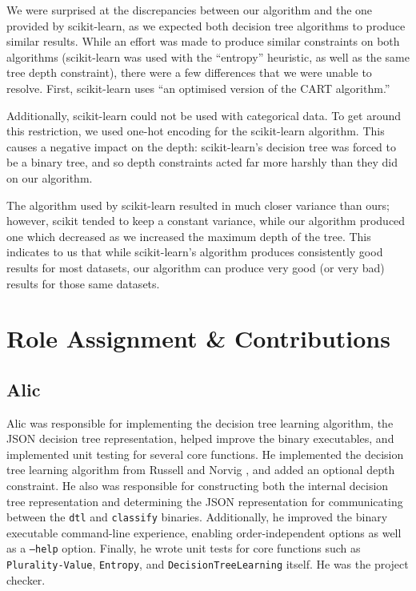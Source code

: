 \documentclass[screen, authorversion, nonacm, sigconf]{acmart}
\begin{document}
We were surprised at the discrepancies between our algorithm and the one provided by scikit-learn, as we expected both decision tree algorithms to produce similar results. While an effort was made to produce similar constraints on both algorithms (scikit-learn was used with the ``entropy'' heuristic, as well as the same tree depth constraint), there were a few differences that we were unable to resolve. First, scikit-learn uses ``an optimised version of the CART \cite{DBLP:books/wa/BreimanFOS84} algorithm.''

Additionally, scikit-learn could not be used with categorical data. To get around this restriction, we used one-hot encoding for the scikit-learn algorithm. This causes a negative impact on the depth: scikit-learn's decision tree was forced to be a binary tree, and so depth constraints acted far more harshly than they did on our algorithm.

The algorithm used by scikit-learn resulted in much closer variance than ours; however, scikit tended to keep a constant variance, while our algorithm produced one which decreased as we increased the maximum depth of the tree. This indicates to us that while scikit-learn's algorithm produces consistently good results for most datasets, our algorithm can produce very good (or very bad) results for those same datasets.

\section{Role Assignment \& Contributions}

\subsection{Alic}

Alic was responsible for implementing the decision tree learning algorithm, the JSON decision tree representation, helped improve the binary executables, and implemented unit testing for several core functions. He implemented the decision tree learning algorithm from Russell and Norvig \cite{russell_norvig_2010}, and added an optional depth constraint. He also was responsible for constructing both the internal decision tree representation and determining the JSON representation for communicating between the \texttt{dtl} and \texttt{classify} binaries. Additionally, he improved the binary executable command-line experience, enabling order-independent options as well as a \texttt{--help} option. Finally, he wrote unit tests for core functions such as \texttt{Plurality-Value}, \texttt{Entropy}, and \texttt{DecisionTreeLearning} itself. He was the project checker.
\end{document}
